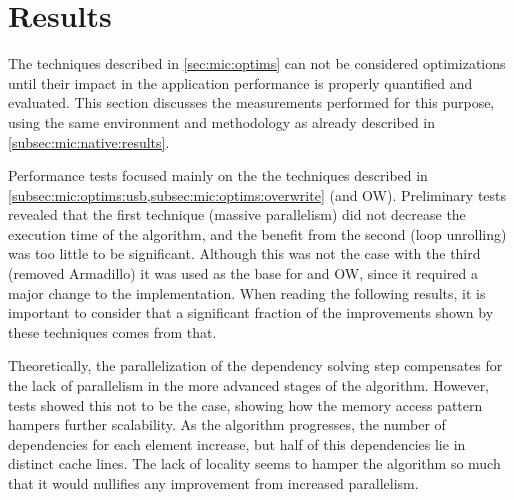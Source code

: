 \documentclass[../thesis]{subfiles}
\begin{document}
	\section{Results}
	\label{sec:mic:results}

	The techniques described in \cref{sec:mic:optims} can not be considered optimizations until their impact in the application performance is properly quantified and evaluated. This section discusses the measurements performed for this purpose, using the same environment and methodology as already described in \cref{subsec:mic:native:results}.

	Performance tests focused mainly on the the techniques described in \cref{subsec:mic:optims:usb,subsec:mic:optims:overwrite} (\usb and OW). Preliminary tests revealed that the first technique (massive parallelism) did not decrease the execution time of the algorithm, and the benefit from the second (loop unrolling) was too little to be significant. Although this was not the case with the third (removed Armadillo) it was used as the base for \usb and OW, since it required a major change to the implementation. When reading the following results, it is important to consider that a significant fraction of the improvements shown by these techniques comes from that.

	Theoretically, the parallelization of the dependency solving step compensates for the lack of parallelism in the more advanced stages of the algorithm. However, tests showed this not to be the case, showing how the memory access pattern hampers further scalability. As the algorithm progresses, the number of dependencies for each element increase, but half of this dependencies lie in distinct cache lines. The lack of locality seems to hamper the algorithm so much that it would nullifies any improvement from increased parallelism.

\end{document}
